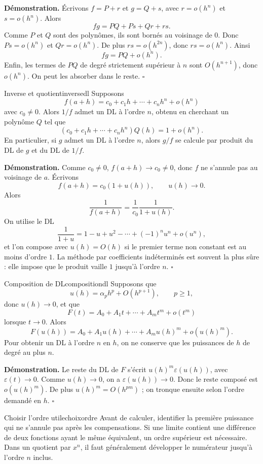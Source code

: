 \documentclass[11pt,a4paper]{article}
\newcommand{\eps}{\varepsilon}
\begin{document}
\textbf{Démonstration.} Écrivons $f=P+r$ et $g=Q+s$, avec $r=o(h^n)$ et $s=o(h^n)$. Alors
\[
  fg=PQ+Ps+Qr+rs.
\]
Comme $P$ et $Q$ sont des polynômes, ils sont bornés au voisinage de $0$. Donc $Ps=o(h^n)$ et $Qr=o(h^n)$. De plus $rs=o(h^{2n})$, donc $rs=o(h^n)$. Ainsi
\[
  fg=PQ+o(h^n).
\]
Enfin, les termes de $PQ$ de degré strictement supérieur à $n$ sont $O(h^{n+1})$, donc $o(h^n)$. On peut les absorber dans le reste.
\hfill $\square$

\begin{propositionbox}{Inverse et quotient}{inversedl}
Supposons
\[
  f(a+h)=c_0+c_1h+\cdots+c_nh^n+o(h^n)
\]
avec $c_0\ne0$. Alors $1/f$ admet un DL à l'ordre $n$, obtenu en cherchant un polynôme $Q$ tel que
\[
  (c_0+c_1h+\cdots+c_nh^n)Q(h)=1+o(h^n).
\]
En particulier, si $g$ admet un DL à l'ordre $n$, alors $g/f$ se calcule par produit du DL de $g$ et du DL de $1/f$.
\end{propositionbox}

\textbf{Démonstration.} Comme $c_0\ne0$, $f(a+h)\to c_0\ne0$, donc $f$ ne s'annule pas au voisinage de $a$. Écrivons
\[
  f(a+h)=c_0(1+u(h)),\qquad u(h)\to0.
\]
Alors
\[
  \frac1{f(a+h)}=\frac1{c_0}\frac1{1+u(h)}.
\]
On utilise le DL
\[
  \frac1{1+u}=1-u+u^2-\cdots+(-1)^n u^n+o(u^n),
\]
et l'on compose avec $u(h)=O(h)$ si le premier terme non constant est au moins d'ordre $1$. La méthode par coefficients indéterminés est souvent la plus sûre : elle impose que le produit vaille $1$ jusqu'à l'ordre $n$.
\hfill $\square$

\begin{propositionbox}{Composition de DL}{compositiondl}
Supposons que
\[
  u(h)=\alpha_p h^p+O(h^{p+1}),\qquad p\ge1,
\]
donc $u(h)\to0$, et que
\[
  F(t)=A_0+A_1t+\cdots+A_m t^m+o(t^m)
\]
lorsque $t\to0$. Alors
\[
  F(u(h))=A_0+A_1u(h)+\cdots+A_m u(h)^m+o(u(h)^m).
\]
Pour obtenir un DL à l'ordre $n$ en $h$, on ne conserve que les puissances de $h$ de degré au plus $n$.
\end{propositionbox}

\textbf{Démonstration.} Le reste du DL de $F$ s'écrit $u(h)^m\eps(u(h))$, avec $\eps(t)\to0$. Comme $u(h)\to0$, on a $\eps(u(h))\to0$. Donc le reste composé est $o(u(h)^m)$. De plus $u(h)^m=O(h^{pm})$ ; on tronque ensuite selon l'ordre demandé en $h$.
\hfill $\square$

\begin{methodbox}{Choisir l'ordre utile}{choixordre}
Avant de calculer, identifier la première puissance qui ne s'annule pas après les compensations. Si une limite contient une différence de deux fonctions ayant le même équivalent, un ordre supérieur est nécessaire. Dans un quotient par $x^n$, il faut généralement développer le numérateur jusqu'à l'ordre $n$ inclus.
\end{methodbox}
\end{document}
